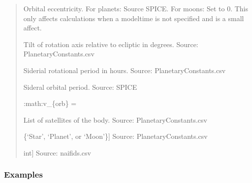 \documentclass[letterpaper,10pt,english]{sphinxmanual}
\begin{document}
\begin{fulllineitems}
\begin{quote}
\begin{description}
\begin{description}
\sphinxAtStartPar
Orbital eccentricity. For planets: Source SPICE. For moons: Set to 0.
This only affects calculations when a modeltime is not specified and
is a small affect.

\sphinxAtStartPar
Tilt of rotation axis relative to ecliptic in degrees.
Source: PlanetaryConstants.csv

\sphinxAtStartPar
Siderial rotational period in hours. Source: PlanetaryConstants.csv

\sphinxAtStartPar
Sideral orbital period. Source: SPICE

\sphinxAtStartPar
:math:{\color{red}\bfseries{}\textasciigrave{}}v\_\{orb\} =

\sphinxAtStartPar
List of satellites of the body. Source: PlanetaryConstants.csv

\sphinxlineitem{\sphinxstylestrong{type}}{[}\{‘Star’, ‘Planet’, or ‘Moon’\}{]}
\sphinxAtStartPar
Source: PlanetaryConstants.csv

\sphinxlineitem{\sphinxstylestrong{naifid}}{[}int{]}
\sphinxAtStartPar
Source: naifids.csv

\end{description}

\end{description}\end{quote}
\subsubsection*{Examples}


\end{fulllineitems}
\end{document}
